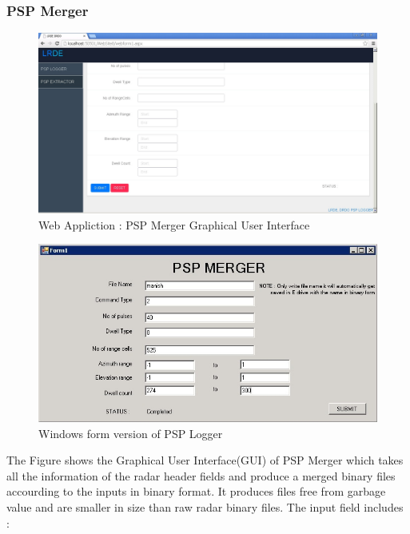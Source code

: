 \documentclass[14pt]{article} %
\begin{document}
  \subsubsection{PSP Merger}
    \begin{figure}[H]
\includegraphics[width=\linewidth]{extractor2.jpg}
  \caption{Web Appliction : PSP Merger Graphical User Interface}
  \label{fig:figure 26}
\end{figure}  
 \begin{figure}[H]
\includegraphics[width=\linewidth]{PSPmerger.jpg}
  \caption{Windows form version of PSP Logger}
  \label{fig:figure 27}
  \end{figure}
 The Figure shows the Graphical User Interface(GUI) of PSP Merger which takes all the information of the radar header fields and produce a merged binary files accourding to the inputs  in binary format. It produces files free from garbage value and are smaller in size than raw radar binary files.
  The input field includes :
\end{document}
